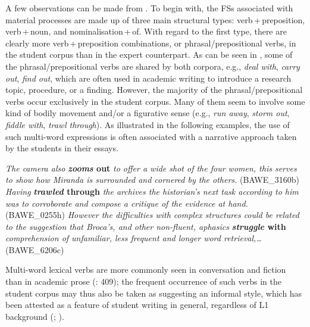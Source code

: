 \documentclass[output=paper]{langscibook}
\begin{document}
A few observations can be made from . To begin with, the FSs associated with material processes are made up of three main structural types: verb\,+\,preposition, verb\,+\,noun, and nominalisation\,+\,of. With regard to the first type, there are clearly more verb\,+\,preposition combinations, or phrasal/prepositional verbs, in the student corpus than in the expert counterpart. As can be seen in , some of the phrasal/prepositional verbs are shared by both corpora, e.g., \textit{deal with}, \textit{carry out}, \textit{find out}, which are often used in academic writing to introduce a research topic, procedure, or a finding. However, the majority of the phrasal/prepositional verbs occur exclusively in the student corpus. Many of them seem to involve some kind of bodily movement and/or a figurative sense (e.g., \textit{run away}, \textit{storm out}, \textit{fiddle with}, \textit{trawl through}). As illustrated in the following examples, the use of such multi-word expressions is often associated with a narrative approach taken by the students in their essays. 

\ea \textit{The camera also} \textbf{\textit{zooms} \textbf{out}} \textit{to offer a wide shot of the four women, this serves to show how Miranda is surrounded and cornered by the others.} (BAWE\_3160b)
\ex \textit{Having} \textbf{\textit{trawled} \textbf{through}} \textit{the archives the historian’s next task according to him was to corroborate and compose a critique of the evidence at hand.} (BAWE\_0255h)
\ex \textit{However the difficulties with complex structures could be related to the suggestion that Broca’s, and other non-fluent, aphasics} \textbf{\textit{struggle} \textbf{with}} \textit{comprehension of unfamiliar, less frequent and longer word retrieval,…} (BAWE\_6206c)
\z

Multi-word lexical verbs are more commonly seen in conversation and fiction than in academic prose (\citealt{BiberEtAl1999}: 409); the frequent occurrence of such verbs in the student corpus may thus also be taken as suggesting an informal style, which has been attested as a feature of student writing in general, regardless of L1 background (\citealt{GrangerRayson1998}; \citealt{GilquinPaquot2008}). 
\end{document}
